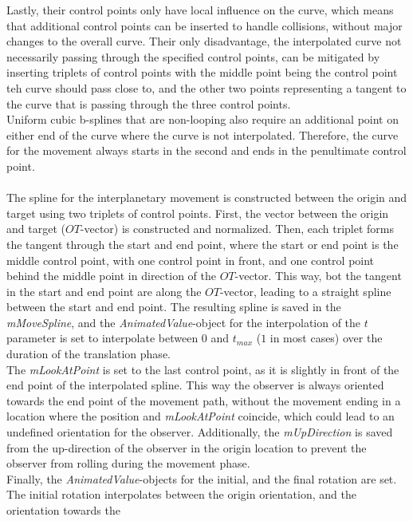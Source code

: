 Lastly, their control points only have local influence on the curve, which means that additional control points can
be inserted to handle collisions, without major changes to the overall curve.
Their only disadvantage, the interpolated curve not necessarily passing through the specified control points, can be
mitigated by inserting triplets of control points with the middle point being the control point teh curve should pass
close to, and the other two points representing a tangent to the curve that is passing through the three control points.
\\
Uniform cubic b-splines that are non-looping also require an additional point on either end of the curve where the
curve is not interpolated.
Therefore, the curve for the movement always starts in the second and ends in the penultimate control point.
\\
\\
The spline for the interplanetary movement is constructed between the origin and target using two triplets of control 
points.
First, the vector between the origin and target ($OT$-vector) is constructed and normalized.
Then, each triplet forms the tangent through the start and end point, where the start or end point is the middle
control point, with one control point in front, and one control point behind the middle point in direction of the
$OT$-vector.
This way, bot the tangent in the start and end point are along the $OT$-vector, leading to a straight spline between
the start and end point.
The resulting spline is saved in the \textit{mMoveSpline}, and the \textit{AnimatedValue}-object for the
interpolation of the $t$ parameter is set to interpolate between $0$ and $t_{max}$ ($1$ in most cases) over the
duration of the translation phase.
\\
The \textit{mLookAtPoint} is set to the last control point, as it is slightly in front of the end point of the
interpolated spline.
This way the observer is always oriented towards the end point of the movement path, without the movement ending in a
location where the position and \textit{mLookAtPoint} coincide, which could lead to an undefined orientation for the
observer.
Additionally, the \textit{mUpDirection} is saved from the up-direction of the observer in the origin location to
prevent the observer from rolling during the movement phase.
\\
Finally, the \textit{AnimatedValue}-objects for the initial, and the final rotation are set.
The initial rotation interpolates between the origin orientation, and the orientation towards the
